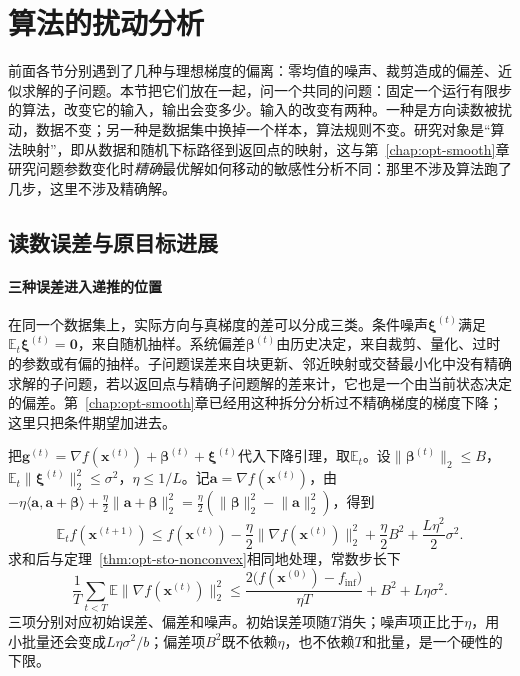\section{算法的扰动分析}
\label{sec:opt-sto-perturbation}

前面各节分别遇到了几种与理想梯度的偏离：零均值的噪声、裁剪造成的偏差、近似求解的子问题。本节把它们放在一起，问一个共同的问题：固定一个运行有限步的算法，改变它的输入，输出会变多少。输入的改变有两种。一种是方向读数被扰动，数据不变；另一种是数据集中换掉一个样本，算法规则不变。研究对象是“算法映射”，即从数据和随机下标路径到返回点的映射，这与第~\ref{chap:opt-smooth}章研究问题参数变化时\emph{精确}最优解如何移动的敏感性分析不同：那里不涉及算法跑了几步，这里不涉及精确解。

\subsection{读数误差与原目标进展}
\label{sec:opt-sto-reading-error}

\paragraph{三种误差进入递推的位置}
在同一个数据集上，实际方向与真梯度的差可以分成三类。条件噪声$\bm\xi^{(t)}$满足$\mathbb E_t\bm\xi^{(t)}=\bm0$，来自随机抽样。系统偏差$\bm\beta^{(t)}$由历史决定，来自裁剪、量化、过时的参数或有偏的抽样。子问题误差来自块更新、邻近映射或交替最小化中没有精确求解的子问题，若以返回点与精确子问题解的差来计，它也是一个由当前状态决定的偏差。第~\ref{chap:opt-smooth}章已经用这种拆分分析过不精确梯度的梯度下降；这里只把条件期望加进去。

把$\bm g^{(t)}=\nabla f(\bm x^{(t)})+\bm\beta^{(t)}+\bm\xi^{(t)}$代入下降引理，取$\mathbb E_t$。设$\lVert\bm\beta^{(t)}\rVert_2\leq B$，$\mathbb E_t\lVert\bm\xi^{(t)}\rVert_2^2\leq\sigma^2$，$\eta\leq1/L$。记$\bm a=\nabla f(\bm x^{(t)})$，由$-\eta\langle\bm a,\bm a+\bm\beta\rangle+\tfrac\eta2\lVert\bm a+\bm\beta\rVert_2^2=\tfrac\eta2(\lVert\bm\beta\rVert_2^2-\lVert\bm a\rVert_2^2)$，得到
\begin{equation}
\label{eq:opt-sto-biased-step}
  \mathbb E_tf(\bm x^{(t+1)})\leq f(\bm x^{(t)})-\frac\eta2\lVert\nabla f(\bm x^{(t)})\rVert_2^2+\frac\eta2B^2+\frac{L\eta^2}2\sigma^2 .
\end{equation}
求和后与定理~\ref{thm:opt-sto-nonconvex}相同地处理，常数步长下
\[
  \frac1T\sum_{t<T}\mathbb E\lVert\nabla f(\bm x^{(t)})\rVert_2^2\leq\frac{2\bigl(f(\bm x^{(0)})-f_{\inf}\bigr)}{\eta T}+B^2+L\eta\sigma^2 .
\]
三项分别对应初始误差、偏差和噪声。初始误差项随$T$消失；噪声项正比于$\eta$，用小批量还会变成$L\eta\sigma^2/b$；偏差项$B^2$既不依赖$\eta$，也不依赖$T$和批量，是一个硬性的下限。

